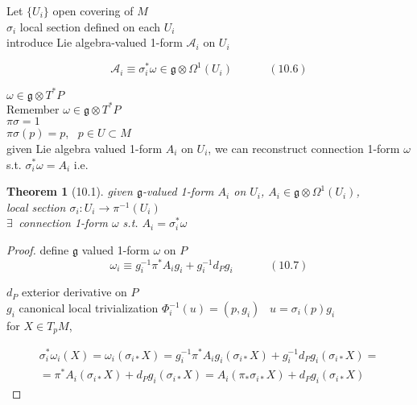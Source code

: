 \documentclass[twoside]{amsart}
\newtheorem{theorem}{Theorem}
\begin{document}
Let $\lbrace U_i \rbrace$ open covering of $M$ \\
\phantom{ Let } $\sigma_i$ local section defined on each $U_i$   \\ 

introduce Lie algebra-valued 1-form $\mathcal{A}_i$ on $U_i$

\begin{equation}
  \mathcal{A}_i \equiv \sigma_i^* \omega \in \mathfrak{g} \otimes \Omega^1(U_i) \quad \quad \quad \, (10.6)
\end{equation}


$\omega \in \mathfrak{g} \otimes T^*P$ \\

Remember $\omega \in \mathfrak{g} \otimes T^*P$ \\
\phantom{Remember } $\pi \sigma = 1$ \\
\phantom{Remember } $\pi \sigma(p) = p$, \, $p \in U \subset M$ \\

given Lie algebra valued 1-form $A_i$ on $U_i$, we can reconstruct connection 1-form $\omega$ s.t. $\sigma_i^* \omega = A_i$ i.e.

\begin{theorem}[10.1]
  given $\mathfrak{g}$-valued 1-form $A_i$ on $U_i$, $A_i \in \mathfrak{g} \otimes \Omega^1(U_i)$, \\
\phantom{given} local section $\sigma_i:U_i \to \pi^{-1}(U_i)$ \\

$\exists \, $ connection 1-form $\omega$ s.t. $A_i = \sigma_i^* \omega$

\end{theorem}

\begin{proof}
define $\mathfrak{g}$ valued 1-form $\omega$ on $P$ 
\begin{equation}
  \omega_i \equiv g_i^{-1} \pi^* A_i g_i + g_i^{-1} d_P g_i \quad \quad \quad \, (10.7)
\end{equation}

$d_P$ exterior derivative on $P$ \\

$g_i$ canonical local trivialization $\Phi_i^{-1}(u) = (p,g_i)$ \quad \, $u = \sigma_i(p)g_i$ \\

for $X \in T_pM$, 

\[
\begin{gathered}
  \sigma_i^*\omega_i(X) = \omega_i(\sigma_{i*}X) = g_i^{-1} \pi^* A_i g_i(\sigma_{i*} X) + g_i^{-1} d_P g_i(\sigma_{i*}X) = \\
  = \pi^*A_i(\sigma_{i*} X) + d_Pg_i(\sigma_{i*}X) = A_i(\pi_* \sigma_{i*}X) + d_Pg_i(\sigma_{i*} X)
\end{gathered}
\]
\end{proof}
\end{document}
